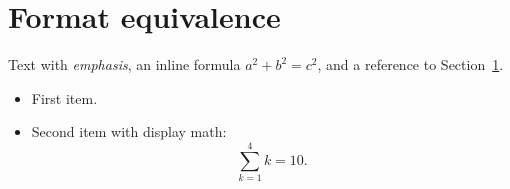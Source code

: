 \documentclass{article}
\begin{document}
\section{Format equivalence}\label{sec:format}
Text with \emph{emphasis}, an inline formula $a^2+b^2=c^2$, and a reference
to Section~\ref{sec:format}.
\begin{itemize}
  \item First item.
  \item Second item with display math:
  \[
    \sum_{k=1}^{4} k = 10.
  \]
\end{itemize}
\end{document}
